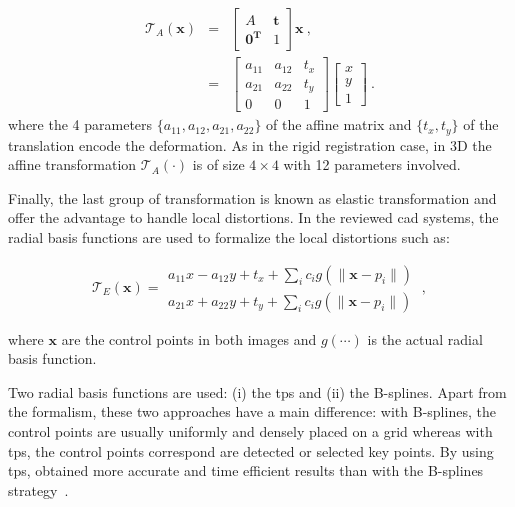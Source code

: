 \begin{eqnarray}
	\mathcal{T}_A(\mathbf{x}) & = & \begin{bmatrix}
		A & \mathbf{t} \\
		\mathbf{0^T} & 1
	\end{bmatrix} \mathbf{x} \ , \nonumber \\
	& = & \begin{bmatrix}
		a_{11} & a_{12} & t_x \\
		a_{21} & a_{22} & t_y \\
		0 & 0 & 1
	\end{bmatrix}\begin{bmatrix}
		x \\
		y \\
		1
	\end{bmatrix} \ . \label{eq:afftra}%
\end{eqnarray}
\noindent where the 4 parameters $\{a_{11},a_{12},a_{21},a_{22}\}$ of the affine matrix and $\{ t_x, t_y \}$ of the translation encode the deformation.
As in the rigid registration case, in 3D the affine transformation $\mathcal{T}_A(\cdot)$ is of size $4 \times 4$ with 12 parameters involved.

Finally, the last group of transformation is known as elastic transformation and offer the advantage to handle local distortions.
In the reviewed \ac{cad} systems, the radial basis functions are used to formalize the local distortions such as:

\begin{equation}
	\mathcal{T}_E(\mathbf{x}) = \begin{matrix}
	a_{11} x - a_{12} y + t_x + \sum_i c_i g(\| \mathbf{x} - p_i \|) \\
	a_{21} x + a_{22} y + t_y + \sum_i c_i g(\| \mathbf{x} - p_i \|)
	\end{matrix} \ ,
\end{equation}

\noindent where $\mathbf{x}$ are the control points in both images and $g(\cdots)$ is the actual radial basis function. 

Two radial basis functions are used: (i) the \ac{tps} and (ii) the B-splines.
Apart from the formalism, these two approaches have a main difference: with B-splines, the control points are usually uniformly and densely placed on a grid whereas with \ac{tps}, the control points correspond are detected or selected key points.
By using \ac{tps}, \citeauthor{Mitra2011} obtained more accurate and time efficient results than with the B-splines strategy~\cite{Mitra2012a}.

